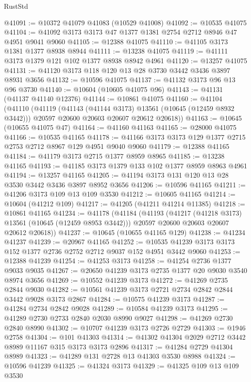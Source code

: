 \begin{lexlean}{RustStd}
\begin{coremodule}
@41091 := @10372 @41079 @41083 (@10529 @41008)
@41092 := @10535 @41075
@41104 := @41092 @3173 @3173 @47 @1377 @1381 @2754 @2712 @8946 @47 @4951 @9041 @9060
@41105 := @12388 @41075
@41110 := @41105 @3173 @1381 @1377 @8938 @8944
@41111 := @13238 @41075
@41119 := @41111 @3173 @1379 @121 @102 @1377 @8938 @8942 @4961
@41120 := @13257 @41075
@41131 := @41120 @3173 @118 @120 @13 @28 @3730 @3442 @3436 @3897 @8931 @3656
@41132 := @10596 @41075
@41137 := @41132 @3173 @96 @13 @96 @3730
@41140 := @10604 (@10605 @41075 @96)
@41143 := @41131 (@41137 @41140 @12376)
@41144 := @10861 @41075
@41160 := @41104
    (@41110
      (@41119
        (@41143 (@41144 @3173) @13561 (@10645 (@12459 @8932 @3442)))
        @20597
        @20600
        @20603
        @20607
        @20612
        @20618))
@41163 := @10645 (@10655 @41075 @47)
@41164 := @41160 @41163
@41165 := @28000 @41075
@41166 := @10535 @41165
@41178 := @41166 @3173 @3173 @129 @1377 @2715 @2753 @2712 @8967 @129 @4951 @9040 @9060
@41179 := @12388 @41165
@41184 := @41179 @3173 @2715 @1377 @8959 @8965
@41185 := @13238 @41165
@41193 := @41185 @3173 @1379 @133 @102 @1377 @8959 @8963 @4961
@41194 := @13257 @41165
@41205 := @41194 @3173 @131 @120 @13 @28 @3530 @3442 @3436 @3897 @8952 @3656
@41206 := @10596 @41165
@41211 := @41206 @3173 @109 @13 @109 @3530
@41212 := @10605 @41165
@41214 := @10604 (@41212 @109)
@41217 := @41205 (@41211 @41214 @11385)
@41218 := @10861 @41165
@41234 := @41178
    (@41184
      (@41193
        (@41217 (@41218 @3173) @13561 (@10645 (@12459 @8953 @3442)))
        @20597
        @20600
        @20603
        @20607
        @20612
        @20618))
@41237 := @10645 (@10655 @41165 @129)
@41238 := @41234 @41237
@41239 := @20967 @41165
@41252 := @10535 @41239 @3173 @3173 @152 @1377 @2736 @2752 @2712 @9037 @152 @4951 @3442 @9060
@41253 := @12388 @41239
@41254 := @41253 @3173
@41258 := @41254 @2736 @1377 @9033 @9035
@41267 := @20650 @41239 @3173 @2735 @1377 @20 @9030 @3540 @8974 @3656
@41269 := @10552 @41239 @3173
@41272 := @41269 @2735 @2844 @9030
@41282 := @10561 @41239 @3173 @2721 @2734 @2842 @2844 @3442 @9028 @3173 @2867
@41284 := @10575 @41239 @3173
@41287 := @41284 @2734 @2842 @9028
@41289 := @10584 @41239 @3173
@41295 := @41289 @2730 @2733 @2840 @2030 @8990 @9027
@41298 := @41269 @2730 @2840 @8990
@41302 := @10707 @41239 @3173 @2726 @2729
@41303 := @1946 @2758
@41304 := @101 @41303
@41314 := @41302 @41304 @2029 @2712 @3442 @8989 @11167 @315 @3173 @3173 @2896
@41317 := @41284 @2729 @41304 @8989
@41323 := @41289 @131 @2728 @13 @41303 @3530 @8988
@41324 := @10596 @41239
@41325 := @41324 @3173
@41329 := @41325 @109 @13 @109 @3530

\end{coremodule}
\end{lexlean}
